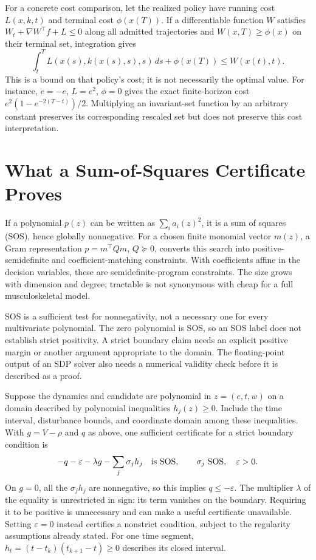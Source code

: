\documentclass[12pt, openany]{book}
\theoremstyle{plain}
\begin{document}
For a concrete cost comparison, let the realized policy have running cost $L(x,k,t)$ and terminal cost $\phi(x(T))$. If a differentiable function $W$ satisfies $W_t+\nabla W^\top f+L\leq0$ along all admitted trajectories and $W(x,T)\geq\phi(x)$ on their terminal set, integration gives
\begin{equation}
 \int_t^T L(x(s),k(x(s),s),s)\,ds+\phi(x(T))\leq W(x(t),t).
 \label{eq:funnel_cost_comparison}
\end{equation}
This is a bound on that policy's cost; it is not necessarily the optimal value. For instance, $\dot e=-e$, $L=e^2$, $\phi=0$ gives the exact finite-horizon cost $e^2(1-e^{-2(T-t)})/2$. Multiplying an invariant-set function by an arbitrary constant preserves its corresponding rescaled set but does not preserve this cost interpretation.

\section{What a Sum-of-Squares Certificate Proves}

If a polynomial $p(z)$ can be written as $\sum_i a_i(z)^2$, it is a sum of squares (SOS), hence globally nonnegative. For a chosen finite monomial vector $m(z)$, a Gram representation $p=m^\top Qm$, $Q\succeq0$, converts this search into positive-semidefinite and coefficient-matching constraints. With coefficients affine in the decision variables, these are semidefinite-program constraints. The size grows with dimension and degree; tractable is not synonymous with cheap for a full musculoskeletal model.

SOS is a sufficient test for nonnegativity, not a necessary one for every multivariate polynomial. The zero polynomial is SOS, so an SOS label does not establish strict positivity. A strict boundary claim needs an explicit positive margin or another argument appropriate to the domain. The floating-point output of an SDP solver also needs a numerical validity check before it is described as a proof.

Suppose the dynamics and candidate are polynomial in $z=(e,t,w)$ on a domain described by polynomial inequalities $h_j(z)\geq0$. Include the time interval, disturbance bounds, and coordinate domain among these inequalities. With $g=V-\rho$ and $q$ as above, one sufficient certificate for a strict boundary condition is
\begin{equation}
 -q-\varepsilon-\lambda g-\sum_j\sigma_jh_j\quad\hbox{is SOS},
 \qquad \sigma_j\ \hbox{SOS},\quad\varepsilon>0.
 \label{eq:funnel_sos_certificate}
\end{equation}
On $g=0$, all the $\sigma_jh_j$ are nonnegative, so this implies $q\leq-\varepsilon$. The multiplier $\lambda$ of the equality is unrestricted in sign: its term vanishes on the boundary. Requiring it to be positive is unnecessary and can make a useful certificate unavailable. Setting $\varepsilon=0$ instead certifies a nonstrict condition, subject to the regularity assumptions already stated. For one time segment, $h_t=(t-t_k)(t_{k+1}-t)\geq0$ describes its closed interval.
\end{document}
